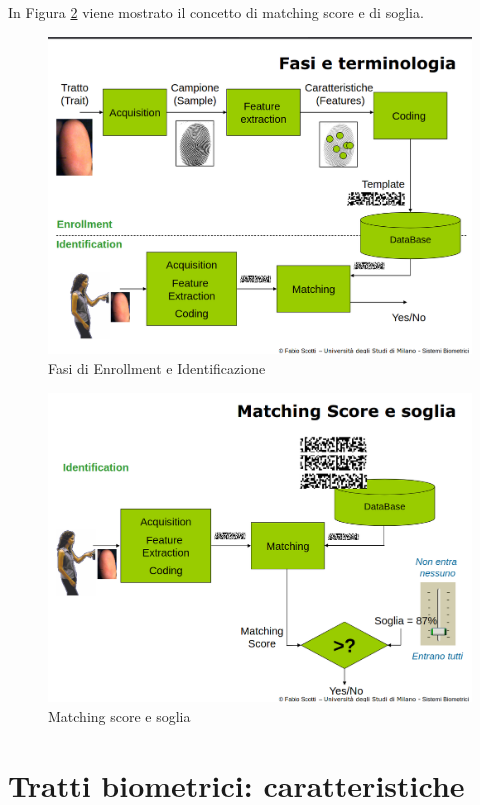 \documentclass{report}
\begin{document}
\noindent In Figura \ref{fig:matching-score} viene mostrato il concetto di matching score e di soglia.

\begin{figure}
    \centering
    \includegraphics[width=0.95\linewidth]{images/enrollment-identification.png}
    \caption{Fasi di Enrollment e Identificazione}
    \label{fig:enroll-ident}
\end{figure}

\begin{figure}
    \centering
    \includegraphics[width=0.95\linewidth]{images/matching-score.png}
    \caption{Matching score e soglia}
    \label{fig:matching-score}
\end{figure}

\chapter{Tratti biometrici: caratteristiche}
\end{document}
